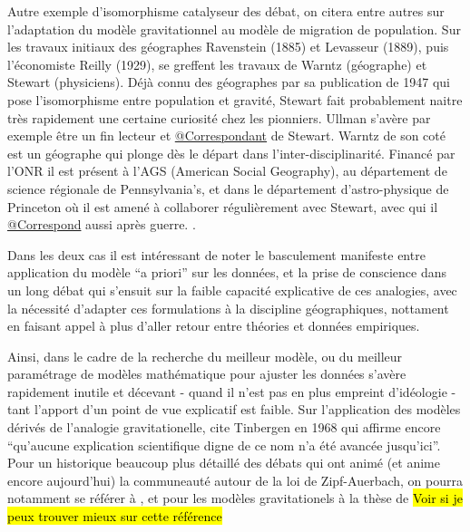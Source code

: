 Autre exemple d'isomorphisme catalyseur des débat, on citera entre autres sur l'adaptation du modèle gravitationnel au modèle de migration de population. Sur les travaux initiaux des géographes Ravenstein (1885) et Levasseur (1889), puis l'économiste Reilly (1929), se greffent les travaux de Warntz (géographe) et Stewart (physiciens). Déjà connu des géographes par sa publication de 1947 qui pose l'isomorphisme entre population et gravité, Stewart fait probablement naitre très rapidement une certaine curiosité chez les pionniers. Ullman s'avère par exemple être un fin lecteur \autocite[61]{Glick1988} et \href{http://nwda.orbiscascade.org/ark:/80444/xv01385}{@Correspondant} de Stewart. Warntz de son coté est un géographe qui plonge dès le départ dans l'inter-disciplinarité. Financé par l'ONR il est présent à l'AGS (American Social Geography), au département de science régionale de Pennsylvania's, et dans le département d'astro-physique de Princeton où il est amené à collaborer régulièrement avec Stewart, avec qui il \href{http://rmc.library.cornell.edu/EAD/htmldocs/RMM04392.html}{@Correspond} aussi après guerre. \autocite{Barnes2006}. 

Dans les deux cas il est intéressant de noter le basculement manifeste entre application du modèle \foreignquote{latin}{a priori} sur les données, et la prise de conscience dans un long débat qui s'ensuit sur la faible capacité explicative de ces analogies, avec la nécessité d'adapter ces formulations à la discipline géographiques, nottament en faisant appel à plus d'aller retour entre théories et données empiriques. 

Ainsi, dans le cadre de la recherche du meilleur modèle, ou du meilleur paramétrage de modèles mathématique pour ajuster les données s'avère rapidement inutile et décevant - quand il n'est pas en plus empreint d'idéologie - tant l'apport d'un point de vue explicatif est faible. Sur l'application des modèles dérivés de l'analogie gravitationelle, \textcite[37]{Pumain1982} cite Tinbergen en 1968 qui affirme encore \enquote{qu'aucune explication scientifique digne de ce nom n'a été avancée jusqu'ici}. Pour un historique beaucoup plus détaillé des débats qui ont animé (et anime encore aujourd'hui) la communeauté autour de la loi de Zipf-Auerbach, on pourra notamment se référer à \textcite{Pumain1982}, et pour les modèles gravitationels à la thèse de \autocite{JensenButler1970} \hl{Voir si je peux trouver mieux sur cette référence}


